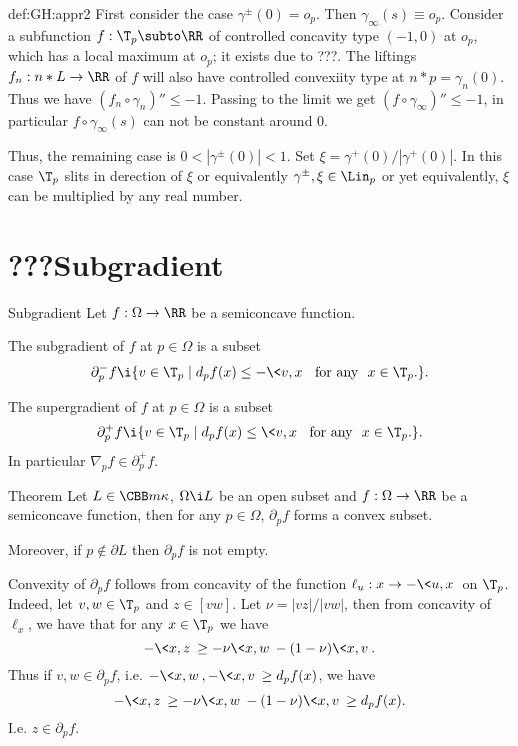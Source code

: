 {\begin{subthm}{def:GH:appr2}
First consider the case $\gamma^\pm(0)=o_p$.
Then $\gamma_\infty(s)\equiv o_p$.
Consider a subfunction $f:\T_p\subto\RR$ of controlled concavity type $(-1,0)$ at $o_p$, which has a local maximum at $o_p$;
it exists due to ???.
The liftings $f_n:n*L\to\RR$ of $f$ will also have controlled convexiity type at $n*p=\gamma_n(0)$.
Thus we have $(f_n\circ\gamma_n)''\le -1$.
Passing to the limit  we get $(f\circ\gamma_\infty)''\le -1$, in particular $f\circ\gamma_\infty(s)$ can not be constant around $0$.\contradiction

Thus, the remaining case is $0<|\gamma^\pm(0)|<1$.
Set $\xi=\gamma^+(0)/|\gamma^+(0)|$.
In this case $\T_p$ slits in derection of $\xi$
or equivalently $\gamma^\pm,\xi\in\Lin_p$
or yet equivalently, $\xi$ can be multiplied by any real number.






















\section{???Subgradient}

\begin{thm}{Subgradient}
Let $f:\Omega\to \RR$ be a semiconcave function.

The subgradient of $f$ at $p\in\Omega$ is a subset 
$$\partial^-_p f\i\{v\in \T_p \mid d_pf(x)\le-\<v,x\> \ \ \text{for any}\ \ x\in \T_p.\}.$$

The supergradient of $f$ at $p\in\Omega$ is a subset 
$$\partial^+_p f\i\{v\in \T_p \mid d_pf(x)\le\<v,x\> \ \ \text{for any}\ \ x\in \T_p.\}.$$
In particular $\nabla_p f\in \partial_p^+f$.
\end{thm}

\begin{thm}{Theorem}
Let $L\in\CBB m\kappa$, $\Omega\i L$ be an open subset and $f:\Omega\to \RR$ be a semiconcave function, then for any $p\in\Omega$, $\partial_p f$ forms a convex subset.

Moreover, if $p\not\in\partial L$ then $\partial_p f$ is not empty.
\end{thm}

 Convexity of $\partial_p f$ follows from concavity of the function $\ell_u:x\to -\<u,x\>$ on $\T_p$.
Indeed, let $v,w\in \T_p$ and $z\in [vw]$.
Let $\nu=|vz|/|vw|$, then from concavity of $\ell_x$, 
we have that for any $x\in \T_p$ we have 
$$-\<x,z\>\ge-\nu\<x,w\>-(1-\nu)\<x,v\>.$$
Thus if $v,w\in\partial_p f$, i.e. $-\<x,w\>,-\<x,v\>\ge d_pf(x)$, we have
$$-\<x,z\>\ge-\nu\<x,w\>-(1-\nu)\<x,v\>\ge d_pf(x).$$
I.e. $z\in \partial_p f$.


\end{subthm}}
